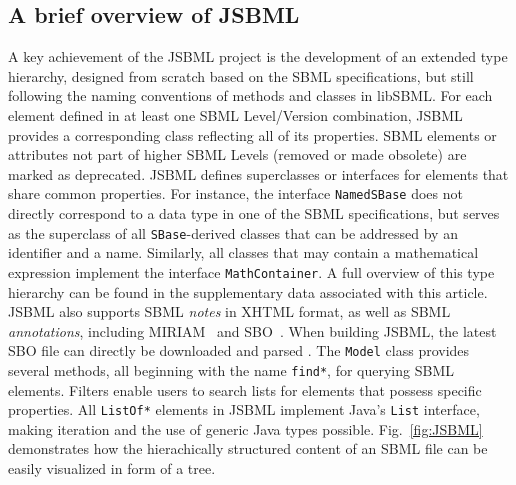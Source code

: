 \documentclass{bioinfo}
\begin{document}
\begin{methods}
\section{A brief overview of JSBML}

A key achievement of the JSBML project is the development of an extended type
hierarchy, designed from scratch based on the SBML specifications, but still
following the naming conventions of methods and classes in
libSBML. For each element defined in at least one SBML Level/Version combination,
JSBML provides a corresponding class reflecting all of its properties. SBML
elements or attributes not part of higher SBML Levels (removed or made
obsolete) are marked as deprecated. JSBML defines superclasses or interfaces for
elements that share common properties. For instance, the interface
\texttt{NamedSBase} does not directly correspond to a data type in one of the
SBML specifications, but serves as the superclass of all \texttt{SBase}-derived
classes that can be addressed by an identifier and a name. Similarly, all classes
that may contain a mathematical expression implement the
interface \texttt{MathContainer}. A full overview of this type hierarchy can be
found in the supplementary data associated with this article. JSBML also
supports SBML \emph{notes} in XHTML format, as well as SBML
\emph{annotations}, including MIRIAM~\citep{Novere2005} and
SBO~\citep{Novere2006b}.
When building JSBML, the latest SBO file can directly be downloaded and parsed
\citep{Holland2008}.
The \texttt{Model} class provides several methods, all beginning with the name
\texttt{find*}, for querying SBML elements. Filters enable users to search lists
for elements that possess specific properties. All \texttt{ListOf*} elements in
JSBML implement Java's \texttt{List} interface, making iteration and the use of
generic Java types possible. Fig.~\ref{fig:JSBML} demonstrates how the
hierachically structured content of an SBML file can be easily visualized in form
of a tree.
\begin{figure}
\centerline{
  }
\end{figure}
\end{methods}
\end{document}
